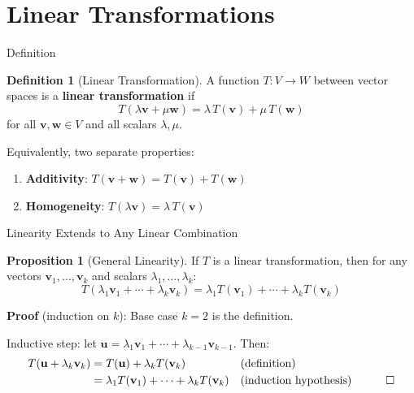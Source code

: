 \documentclass[10pt]{beamer}
\theoremstyle{definition}
\newtheorem{defi}{Definition}[section]
\newtheorem{prop}{Proposition}[section]
\newcommand{\x}[1]{\alert{\textbf{#1}}}
\begin{document}
\section{Linear Transformations}

\begin{frame}{Definition}

\begin{defi}[Linear Transformation]
A function $T: V \to W$ between vector spaces is a \x{linear transformation} if
$$T(\lambda \mathbf{v} + \mu \mathbf{w}) = \lambda\, T(\mathbf{v}) + \mu\, T(\mathbf{w})$$
for all $\mathbf{v}, \mathbf{w} \in V$ and all scalars $\lambda, \mu$.
\end{defi}

\vspace{1em}

Equivalently, two separate properties:
\begin{enumerate}
\item \x{Additivity}: $T(\mathbf{v} + \mathbf{w}) = T(\mathbf{v}) + T(\mathbf{w})$
\item \x{Homogeneity}: $T(\lambda \mathbf{v}) = \lambda\, T(\mathbf{v})$
\end{enumerate}

\end{frame}

\begin{frame}{Linearity Extends to Any Linear Combination}

\begin{prop}[General Linearity]
If $T$ is a linear transformation, then for any vectors $\mathbf{v}_1, \ldots, \mathbf{v}_k$ and scalars $\lambda_1, \ldots, \lambda_k$:
$$T(\lambda_1 \mathbf{v}_1 + \cdots + \lambda_k \mathbf{v}_k) = \lambda_1 T(\mathbf{v}_1) + \cdots + \lambda_k T(\mathbf{v}_k)$$
\end{prop}

\textbf{Proof} (induction on $k$): Base case $k = 2$ is the definition.

\vspace{0.3em}

Inductive step: let $\mathbf{u} = \lambda_1 \mathbf{v}_1 + \cdots + \lambda_{k-1} \mathbf{v}_{k-1}$. Then:
\begin{align*}
T(\mathbf{u} + \lambda_k \mathbf{v}_k)
&= T(\mathbf{u}) + \lambda_k T(\mathbf{v}_k) & &\text{(definition)}\\
&= \lambda_1 T(\mathbf{v}_1) + \cdots + \lambda_k T(\mathbf{v}_k) & &\text{(induction hypothesis)} \quad\qed
\end{align*}

\end{frame}
\end{document}
